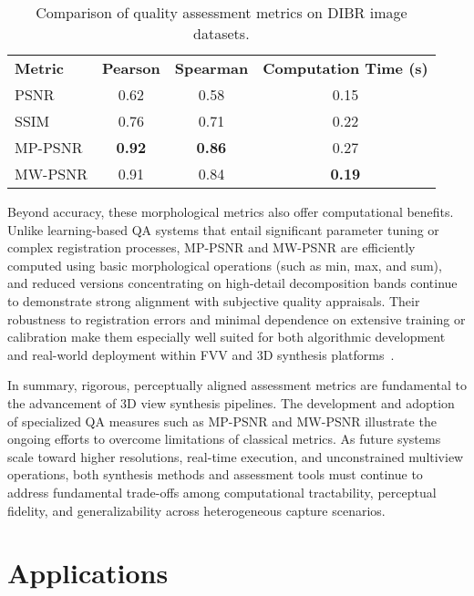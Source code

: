 \documentclass[sigconf]{acmart}
\begin{document}
\begin{table*}[htbp]
\centering
\caption{Comparison of quality assessment metrics on DIBR image datasets.}
\label{tab:metric_performance}
\begin{adjustbox}{max width=\textwidth}
\begin{tabular}{lccc}
\toprule
\textbf{Metric} & \textbf{Pearson} & \textbf{Spearman} & \textbf{Computation Time (s)} \\
PSNR     & 0.62 & 0.58 & 0.15 \\
SSIM     & 0.76 & 0.71 & 0.22 \\
MP-PSNR  & \textbf{0.92} & \textbf{0.86} & 0.27 \\
MW-PSNR  & 0.91 & 0.84 & \textbf{0.19} \\
\bottomrule
\end{tabular}
\end{adjustbox}
\end{table*}

Beyond accuracy, these morphological metrics also offer computational benefits. Unlike learning-based QA systems that entail significant parameter tuning or complex registration processes, MP-PSNR and MW-PSNR are efficiently computed using basic morphological operations (such as min, max, and sum), and reduced versions concentrating on high-detail decomposition bands continue to demonstrate strong alignment with subjective quality appraisals. Their robustness to registration errors and minimal dependence on extensive training or calibration make them especially well suited for both algorithmic development and real-world deployment within FVV and 3D synthesis platforms~\cite{refQARef99}.

In summary, rigorous, perceptually aligned assessment metrics are fundamental to the advancement of 3D view synthesis pipelines. The development and adoption of specialized QA measures such as MP-PSNR and MW-PSNR illustrate the ongoing efforts to overcome limitations of classical metrics. As future systems scale toward higher resolutions, real-time execution, and unconstrained multiview operations, both synthesis methods and assessment tools must continue to address fundamental trade-offs among computational tractability, perceptual fidelity, and generalizability across heterogeneous capture scenarios.

\section{Applications}
\end{document}
